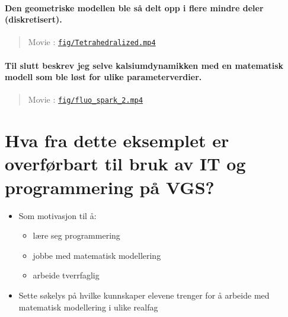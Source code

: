 \documentclass[%
oneside,                 %
final,                   %
10pt]{article}
\newenvironment{doconce:movie}{}{}
\newcounter{doconce:movie:counter}
\begin{document}
\paragraph{Den geometriske modellen ble så delt opp i flere mindre deler (diskretisert).}
\begin{doconce:movie}
\begin{quote}
Movie :  \href{run:fig/Tetrahedralized.mp4}{\nolinkurl{fig/Tetrahedralized.mp4}}
\end{quote}
\end{doconce:movie}



\paragraph{Til slutt beskrev jeg selve kalsiumdynamikken med en matematisk modell som ble løst for ulike parameterverdier.}
\begin{doconce:movie}
\begin{quote}
Movie :  \href{run:fig/fluo_spark_2.mp4}{\nolinkurl{fig/fluo_spark_2.mp4}}
\end{quote}
\end{doconce:movie}



\section{Hva fra dette eksemplet er overførbart til bruk av IT og programmering på VGS?}

\begin{itemize}
\item Som motivasjon til å:
\begin{itemize}

  \item lære seg programmering

  \item jobbe med matematisk modellering

  \item arbeide tverrfaglig

\end{itemize}

\noindent
\item Sette søkelys på hvilke kunnskaper elevene trenger for å arbeide med matematisk modellering i ulike realfag
\end{itemize}
\end{document}
